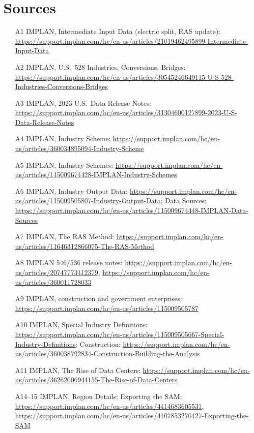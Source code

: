 \documentclass[11pt]{article}
\begin{document}
\section*{Sources}
\begin{itemize}\footnotesize
  \item[A1] IMPLAN, Intermediate Input Data (electric split, RAS update): \url{https://support.implan.com/hc/en-us/articles/21019462495899-Intermediate-Input-Data}
  \item[A2] IMPLAN, U.S.\ 528 Industries, Conversions, Bridges: \url{https://support.implan.com/hc/en-us/articles/30545246649115-U-S-528-Industries-Conversions-Bridges}
  \item[A3] IMPLAN, 2023 U.S.\ Data Release Notes: \url{https://support.implan.com/hc/en-us/articles/31304600127899-2023-U-S-Data-Release-Notes}
  \item[A4] IMPLAN, Industry Scheme: \url{https://support.implan.com/hc/en-us/articles/360034895094-Industry-Scheme}
  \item[A5] IMPLAN, Industry Schemes: \url{https://support.implan.com/hc/en-us/articles/115009674428-IMPLAN-Industry-Schemes}
  \item[A6] IMPLAN, Industry Output Data: \url{https://support.implan.com/hc/en-us/articles/115009505807-Industry-Output-Data}; Data Sources: \url{https://support.implan.com/hc/en-us/articles/115009674448-IMPLAN-Data-Sources}
  \item[A7] IMPLAN, The RAS Method: \url{https://support.implan.com/hc/en-us/articles/11646312866075-The-RAS-Method}
  \item[A8] IMPLAN 546/536 release notes: \url{https://support.implan.com/hc/en-us/articles/20747773412379}, \url{https://support.implan.com/hc/en-us/articles/360011728033}
  \item[A9] IMPLAN, construction and government enterprises: \url{https://support.implan.com/hc/en-us/articles/115009505787}
  \item[A10] IMPLAN, Special Industry Definitions: \url{https://support.implan.com/hc/en-us/articles/115009505667-Special-Industry-Definitions}; Construction: \url{https://support.implan.com/hc/en-us/articles/360038792834-Construction-Building-the-Analysis}
  \item[A11] IMPLAN, The Rise of Data Centers: \url{https://support.implan.com/hc/en-us/articles/36262006944155-The-Rise-of-Data-Centers}
  \item[A14--15] IMPLAN, Region Details; Exporting the SAM: \url{https://support.implan.com/hc/en-us/articles/4414683605531}, \url{https://support.implan.com/hc/en-us/articles/4407853270427-Exporting-the-SAM}

\end{itemize}
\end{document}
